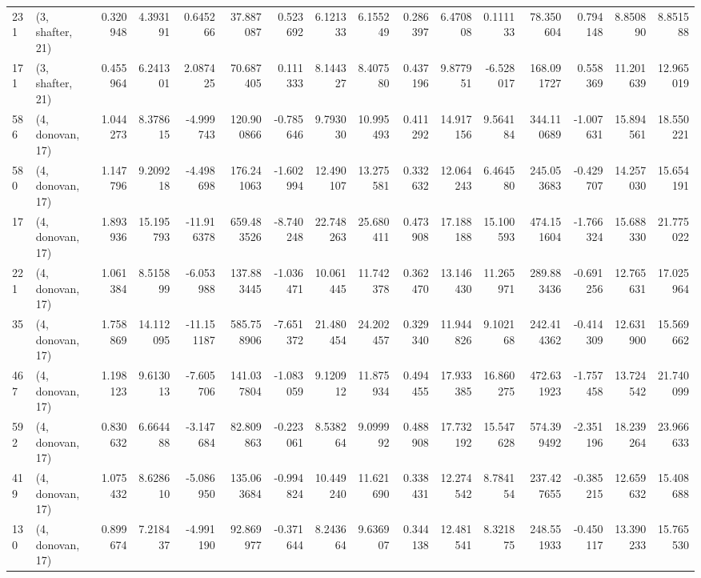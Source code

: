 \begin{tabular}{llrrrrrrrrrrrrrr}
231 &  (3, shafter, 21) &   0.320948 &   4.393191 &   0.645266 &    37.887087 &   0.523692 &   6.121333 &   6.155249 &  0.286397 &   6.470808 &   0.111133 &    78.350604 &  0.794148 &   8.850890 &   8.851588 \\
171 &  (3, shafter, 21) &   0.455964 &   6.241301 &   2.087425 &    70.687405 &   0.111333 &   8.144327 &   8.407580 &  0.437196 &   9.877951 &  -6.528017 &   168.091727 &  0.558369 &  11.201639 &  12.965019 \\
586 &  (4, donovan, 17) &   1.044273 &   8.378615 &  -4.999743 &   120.900866 &  -0.785646 &   9.793030 &  10.995493 &  0.411292 &  14.917156 &   9.564184 &   344.110689 & -1.007631 &  15.894561 &  18.550221 \\
580 &  (4, donovan, 17) &   1.147796 &   9.209218 &  -4.498698 &   176.241063 &  -1.602994 &  12.490107 &  13.275581 &  0.332632 &  12.064243 &   6.464580 &   245.053683 & -0.429707 &  14.257030 &  15.654191 \\
17  &  (4, donovan, 17) &   1.893936 &  15.195793 & -11.916378 &   659.483526 &  -8.740248 &  22.748263 &  25.680411 &  0.473908 &  17.188188 &  15.100593 &   474.151604 & -1.766324 &  15.688330 &  21.775022 \\
221 &  (4, donovan, 17) &   1.061384 &   8.515899 &  -6.053988 &   137.883445 &  -1.036471 &  10.061445 &  11.742378 &  0.362470 &  13.146430 &  11.265971 &   289.883436 & -0.691256 &  12.765631 &  17.025964 \\
35  &  (4, donovan, 17) &   1.758869 &  14.112095 & -11.151187 &   585.758906 &  -7.651372 &  21.480454 &  24.202457 &  0.329340 &  11.944826 &   9.102168 &   242.414362 & -0.414309 &  12.631900 &  15.569662 \\
467 &  (4, donovan, 17) &   1.198123 &   9.613013 &  -7.605706 &   141.037804 &  -1.083059 &   9.120912 &  11.875934 &  0.494455 &  17.933385 &  16.860275 &   472.631923 & -1.757458 &  13.724542 &  21.740099 \\
592 &  (4, donovan, 17) &   0.830632 &   6.664488 &  -3.147684 &    82.809863 &  -0.223061 &   8.538264 &   9.099992 &  0.488908 &  17.732192 &  15.547628 &   574.399492 & -2.351196 &  18.239264 &  23.966633 \\
419 &  (4, donovan, 17) &   1.075432 &   8.628610 &  -5.086950 &   135.063684 &  -0.994824 &  10.449240 &  11.621690 &  0.338431 &  12.274542 &   8.784154 &   237.427655 & -0.385215 &  12.659632 &  15.408688 \\
130 &  (4, donovan, 17) &   0.899674 &   7.218437 &  -4.991190 &    92.869977 &  -0.371644 &   8.243664 &   9.636907 &  0.344138 &  12.481541 &   8.321875 &   248.551933 & -0.450117 &  13.390233 &  15.765530 \\

\end{tabular}
